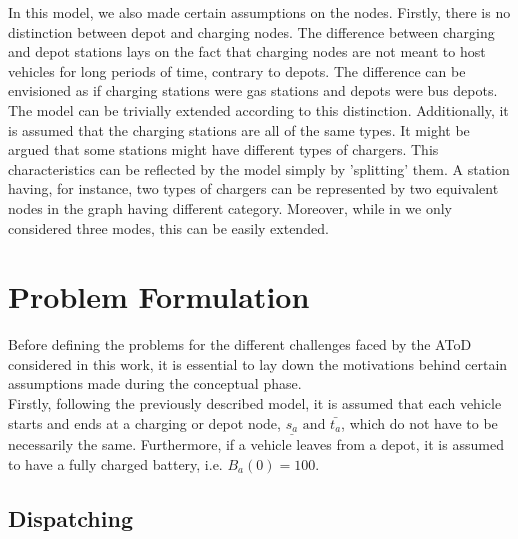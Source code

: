 In this model, we also made certain assumptions on the nodes. Firstly, there is no distinction between depot and charging nodes. The difference between charging and depot stations lays on the fact that charging nodes are not meant to host vehicles for long periods of time, contrary to depots. The difference can be envisioned as if charging stations were gas stations and depots were bus depots. The  model can be trivially extended according to this distinction. Additionally, it is assumed that the charging stations are all of the same types. It might be argued that some stations might have different types of chargers. This characteristics can be reflected by the model simply by 'splitting' them. A station having, for instance, two types of chargers can be represented by two equivalent nodes in the graph having different category. Moreover, while in  we only considered three modes, this can be easily extended. 


\section{Problem Formulation}\label{sec:prob_form}
Before defining the problems for the different challenges faced by the AToD considered in this work, it is essential to lay down the motivations behind certain assumptions made during the conceptual phase. \\
Firstly, following the previously described model, it is assumed that each vehicle starts and ends at a charging or depot node, $\underline{s_a} \text{ and }\bar{t_a}$, which do not have to be necessarily the same. Furthermore, if a vehicle leaves from a depot, it is assumed to have a fully charged battery, i.e. $B_a(0) = 100$. 



\subsection{Dispatching}

